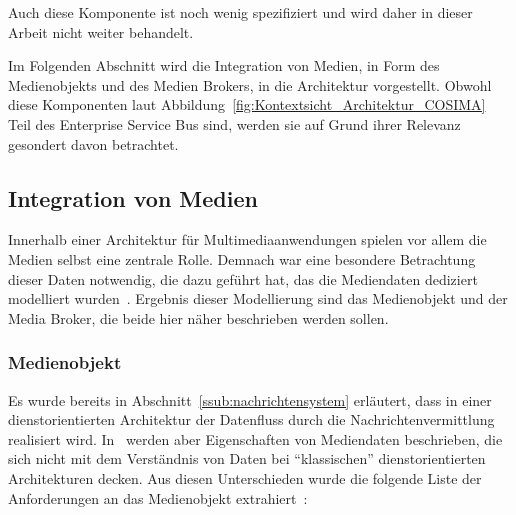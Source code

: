   Auch diese Komponente ist noch wenig spezifiziert und wird daher in dieser Arbeit nicht weiter behandelt.
  
  Im Folgenden Abschnitt wird die Integration von Medien, in Form des Medienobjekts und des Medien Brokers, in die Architektur vorgestellt. Obwohl diese Komponenten laut Abbildung~\ref{fig:Kontextsicht_Architektur_COSIMA} Teil des Enterprise Service Bus sind, werden sie auf Grund ihrer Relevanz gesondert davon betrachtet.



\subsection{Integration von Medien} %
\label{sub:integration_von_medien}

  Innerhalb einer Architektur für Multimediaanwendungen spielen vor allem die Medien selbst eine zentrale Rolle. Demnach war eine besondere Betrachtung dieser Daten notwendig, die dazu geführt hat, das die Mediendaten dediziert modelliert wurden~\citep{bericht}. Ergebnis dieser Modellierung sind das Medienobjekt und der Media Broker, die beide hier näher beschrieben werden sollen.
  
\subsubsection{Medienobjekt} %
\label{ssub:medienobjekt}

  Es wurde bereits in Abschnitt~\ref{ssub:nachrichtensystem} erläutert, dass in einer dienstorientierten Architektur der Datenfluss durch die Nachrichtenvermittlung realisiert wird. In~\citep[S. 27ff]{bericht} werden aber Eigenschaften von Mediendaten beschrieben, die sich nicht mit dem Verständnis von Daten bei "`klassischen"' dienstorientierten Architekturen decken. Aus diesen Unterschieden wurde die folgende Liste der Anforderungen an das Medienobjekt extrahiert~\citep{bericht}:
  
